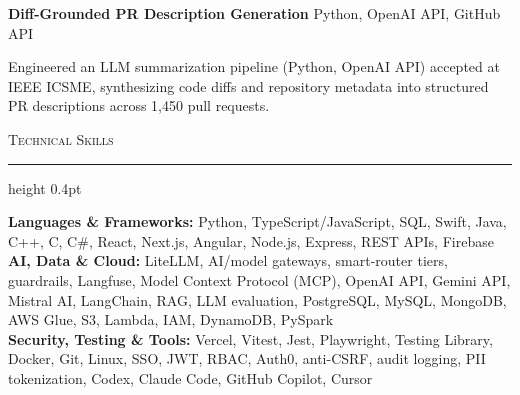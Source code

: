 \documentclass[letterpaper,11pt]{article}
\newcommand{\resumesection}[1]{%
  \par\vspace{2pt}%
  {\large\scshape #1}\par\vspace{2pt}%
  \hrule height 0.4pt\vspace{2pt}%
}
\newcommand{\projectHeading}[2]{
  \textbf{#1} \hfill #2
}
\begin{document}
\vspace{-4pt}
\projectHeading{Diff-Grounded PR Description Generation}{Python, OpenAI API, GitHub API}
\begin{tightitemize}
  \item Engineered an LLM summarization pipeline (Python, OpenAI API) accepted at IEEE ICSME, synthesizing code diffs and repository metadata into structured PR descriptions across 1,450 pull requests.
\end{tightitemize}

\vspace{-4pt}
\resumesection{Technical Skills}
\textbf{Languages \& Frameworks:} Python, TypeScript/JavaScript, SQL, Swift, Java, C++, C, C\#, React, Next.js, Angular, Node.js, Express, REST APIs, Firebase\\
\textbf{AI, Data \& Cloud:} LiteLLM, AI/model gateways, smart-router tiers, guardrails, Langfuse, Model Context Protocol (MCP), OpenAI API, Gemini API, Mistral AI, LangChain, RAG, LLM evaluation, PostgreSQL, MySQL, MongoDB, AWS Glue, S3, Lambda, IAM, DynamoDB, PySpark\\
\textbf{Security, Testing \& Tools:} Vercel, Vitest, Jest, Playwright, Testing Library, Docker, Git, Linux, SSO, JWT, RBAC, Auth0, anti-CSRF, audit logging, PII tokenization, Codex, Claude Code, GitHub Copilot, Cursor
\end{document}
